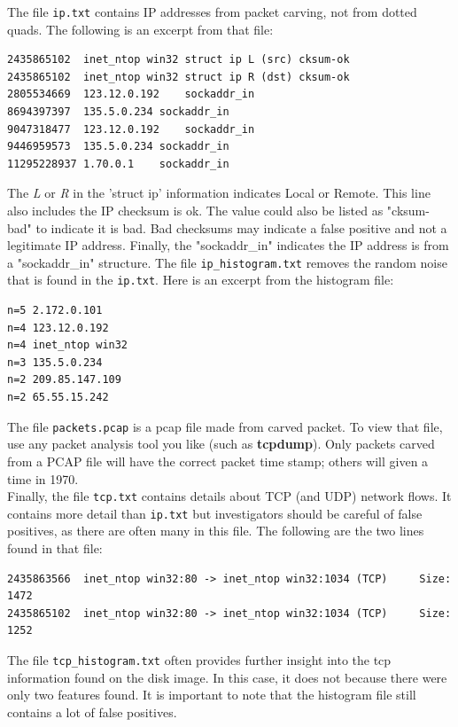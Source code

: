 The file \texttt{ip.txt} contains IP addresses from packet carving, not from dotted quads. The following is an excerpt from that file:
\lstset{style=customfile}
\begin{lstlisting}
2435865102	inet_ntop win32	struct ip L (src) cksum-ok
2435865102	inet_ntop win32	struct ip R (dst) cksum-ok
2805534669	123.12.0.192	sockaddr_in
8694397397	135.5.0.234	sockaddr_in
9047318477	123.12.0.192	sockaddr_in
9446959573	135.5.0.234	sockaddr_in
11295228937	1.70.0.1	sockaddr_in
\end{lstlisting}
The \textit{L} or \textit{R} in the 'struct ip' information indicates Local or Remote. This line also includes the IP checksum is ok. The value could also be listed as "cksum-bad" to indicate it is bad. Bad checksums may indicate a false positive and not a legitimate IP address. Finally, the "sockaddr\_in" indicates the IP address is from a "sockaddr\_in" structure. The file \texttt{ip\_histogram.txt} removes the random noise that is found in the \texttt{ip.txt}. Here is an excerpt from the histogram file:
\lstset{style=customfile}
\begin{lstlisting}
n=5	2.172.0.101
n=4	123.12.0.192
n=4	inet_ntop win32
n=3	135.5.0.234
n=2	209.85.147.109
n=2	65.55.15.242
\end{lstlisting}

The file \texttt{packets.pcap} is a pcap file made from carved packet. To view that file, use any packet analysis tool you like (such as \textbf{tcpdump}). Only packets carved from a PCAP  file will have the correct packet time stamp; others will given a time in 1970.\\

Finally, the file \texttt{tcp.txt} contains details about TCP (and UDP) network flows. It contains more detail than \texttt{ip.txt} but investigators should be careful of false positives, as there are often many in this file. The following are the two lines found in that file:
\lstset{style=customfile}
\begin{lstlisting}
2435863566	inet_ntop win32:80 -> inet_ntop win32:1034 (TCP)	 Size: 1472
2435865102	inet_ntop win32:80 -> inet_ntop win32:1034 (TCP)	 Size: 1252
\end{lstlisting}
The file \texttt{tcp\_histogram.txt} often provides further insight into the tcp information found on the disk image. In this case, it does not because there were only two features found. It is important to note that the histogram file still contains a lot of false positives.

